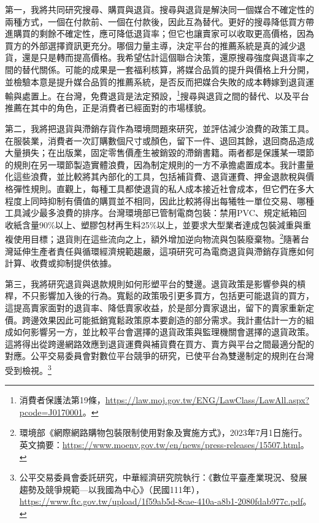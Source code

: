 \documentclass[11pt,letterpaper]{article}
\begin{document}
第一，我將共同研究搜尋、購買與退貨。搜尋與退貨是解決同一個媒合不確定性的兩種方式，一個在付款前、一個在付款後，因此互為替代。更好的搜尋降低買方帶進購買的剩餘不確定性，應可降低退貨率；但它也讓賣家可以收取更高價格，因為買方的外部選擇資訊更充分。哪個力量主導，決定平台的推薦系統是真的減少退貨，還是只是轉而提高價格。我希望估計這個聯合決策，還原搜尋強度與退貨率之間的替代關係。可能的成果是一套福利核算，將媒合品質的提升與價格上升分開，並檢驗本意是提升媒合品質的推薦系統，是否反而把媒合失敗的成本轉嫁到退貨運輸與處置上。在台灣，免費退貨是法定預設，\footnote{消費者保護法第19條，\url{https://law.moj.gov.tw/ENG/LawClass/LawAll.aspx?pcode=J0170001}。}搜尋與退貨之間的替代、以及平台推薦在其中的角色，正是消費者已經面對的市場樣貌。

第二，我將把退貨與滯銷存貨作為環境問題來研究，並評估減少浪費的政策工具。在服裝業，消費者一次訂購數個尺寸或顏色，留下一件、退回其餘，退回商品造成大量損失；在出版業，固定零售價產生被銷毀的滯銷書籍。兩者都是保護某一環節的規則在另一環節製造實體浪費，因為制定規則的一方不承擔處置成本。我計畫量化這些浪費，並比較將其內部化的工具，包括補貨費、退貨運費、押金退款稅與價格彈性規則。直觀上，每種工具都使退貨的私人成本接近社會成本，但它們在多大程度上同時抑制有價值的購買並不相同，因此比較將得出每犧牲一單位交易、哪種工具減少最多浪費的排序。台灣環境部已管制電商包裝：禁用PVC、規定紙箱回收紙含量90\%以上、塑膠包材再生料25\%以上，並要求大型業者達成包裝減重與重複使用目標；退貨則在這些流向之上，額外增加逆向物流與包裝廢棄物。\footnote{環境部《網際網路購物包裝限制使用對象及實施方式》，2023年7月1日施行。英文摘要：\url{https://www.moenv.gov.tw/en/news/press-releases/15507.html}。}隨著台灣延伸生產者責任與循環經濟規範趨嚴，這項研究可為電商退貨與滯銷存貨應如何計算、收費或抑制提供依據。

第三，我將研究退貨與退款規則如何形塑平台的雙邊。退貨政策是影響參與的槓桿，不只影響加入後的行為。寬鬆的政策吸引更多買方，包括更可能退貨的買方，這提高賣家面對的退貨率、降低賣家收益，於是部分賣家退出，留下的賣家重新定價。跨邊效果因此可能抵銷寬鬆政策原本要創造的部分需求。我計畫估計一方的組成如何影響另一方，並比較平台會選擇的退貨政策與監理機關會選擇的退貨政策。這將得出從跨邊網路效應到退貨運費與補貨費在買方、賣方與平台之間最適分配的對應。公平交易委員會對數位平台競爭的研究，已使平台為雙邊制定的規則在台灣受到檢視。\footnote{公平交易委員會委託研究，中華經濟研究院執行：《數位平臺產業現況、發展趨勢及競爭規範—以我國為中心》（民國111年），\url{https://www.ftc.gov.tw/upload/1f59ab5d-8cae-410a-a8b1-2080fdab977c.pdf}。}
\end{document}
